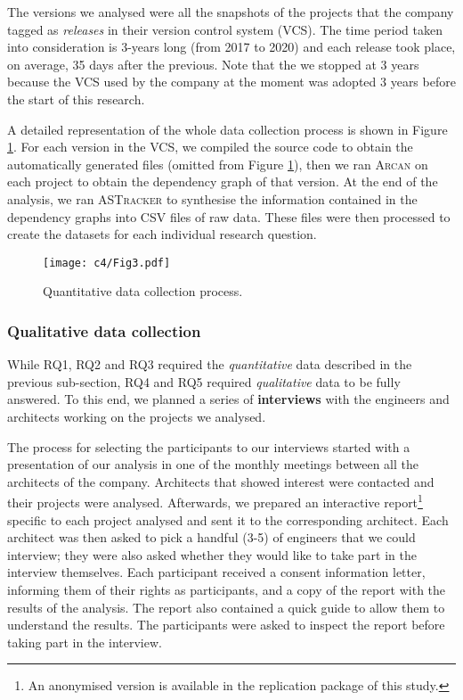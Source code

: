 The versions we analysed were all the snapshots of the projects that the company tagged as \emph{releases} in their version control system (VCS). The time period taken into consideration is 3-years long (from 2017 to 2020) and each release took place, on average, 35 days after the previous. Note that the we stopped at 3 years because the VCS used by the company at the moment was adopted 3 years before the start of this research.

A detailed representation of the whole data collection process is shown in Figure \ref{c4:fig:data-collection-process}.
For each version in the VCS, we compiled the source code to obtain the automatically generated files (omitted from Figure \ref{c4:fig:data-collection-process}), then we ran \textsc{Arcan} on each project to obtain the dependency graph of that version.
At the end of the analysis, we ran \textsc{ASTracker} to synthesise the information contained in the dependency graphs into CSV files of raw data. These files were then processed to create the datasets for each individual research question.

\begin{figure}
    \centering
    \texttt{[image: c4/Fig3.pdf]}
    \caption{Quantitative data collection process.}\label{c4:fig:data-collection-process}
\end{figure}

\subsubsection{Qualitative data collection}
While RQ1, RQ2 and RQ3 required the \emph{quantitative} data described in the previous sub-section, RQ4 and RQ5 required \emph{qualitative} data to be fully answered. 
To this end, we planned a series of \textbf{interviews} with the engineers and architects working on the projects we analysed.

The process for selecting the participants to our interviews started with a presentation of our analysis in one of the monthly meetings between all the architects of the company.
Architects that showed interest were contacted and their projects were analysed. 
Afterwards, we prepared an interactive report\footnote{An anonymised version is available in the replication package of this study.} specific to each project analysed and sent it to the corresponding architect.
Each architect was then asked to pick a handful (3-5) of engineers that we could interview; they were also asked whether they would like to take part in the interview themselves.
Each participant received a consent information letter, informing them of their rights as participants, and a copy of the report with the results of the analysis. The report also contained a quick guide to allow them to understand the results. The participants were asked to inspect the report before taking part in the interview. 

